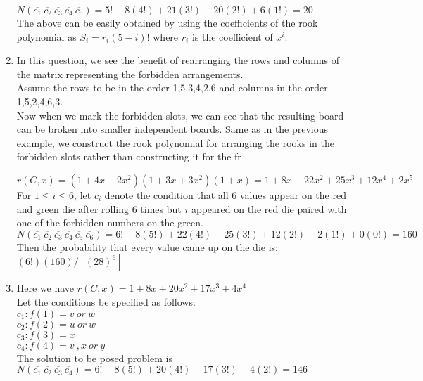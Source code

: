 \documentclass[a4paper]{article}
\begin{document}
\begin{enumerate}
$N(\overline{c_1}~\overline{c_2}~\overline{c_3}~\overline{c_4}~\overline{c_5}) = 5!-8(4!)+ 21(3!) -20(2!) +  6(1!) = 20 $ \\

The above can be easily obtained by using the coefficients of the rook polynomial as $S_i = r_i(5-i)!$ where $r_i$ is the coefficient of $x^i$. 


\item In this question, we see the benefit of rearranging the rows and columns of the matrix representing the forbidden arrangements. \\
Assume the rows to be in the order 1,5,3,4,2,6 and columns in the order 1,5,2,4,6,3. \\
Now when we mark the forbidden slots, we can see that the resulting board can be broken into smaller independent boards. Same as in the previous example, we construct the rook polynomial for arranging the rooks in the forbidden slots rather than constructing it for the fr

$r(C,x)=(1+4x+2x^2)(1+3x+3x^2)(1+x)=1+8x+22x^2+25x^3+12x^4+2x^5$\\
For $1\leq i \leq 6$, let $c_i$ denote the condition that all 6 values appear on the red and green die after rolling 6 times but $i$ appeared on the red die paired with one of the forbidden numbers on the green. \\

$N(\overline{c_1}~\overline{c_2}~\overline{c_3}~\overline{c_4}~\overline{c_5}~\overline{c_6}) = 6!-8(5!)+ 22(4!) -25(3!) +  12(2!) - 2(1!) + 0(0!) = 160 $\\
Then the probability that every value came up on the die is: $(6!)(160)/[(28)^6]$ 


\item Here we have $r(C,x) = 1+8x+20x^2+17x^3+4x^4$\\
Let the conditions be specified as follows:\\
$c_1: f(1)= v\ or\ w$\\
$c_2: f(2)= u\ or\ w$\\
$c_3: f(3)=x$\\
$c_4: f(4)= v\ ,x\ or\ y$\\ 
The solution to be posed problem is $N(\overline{c_1}~\overline{c_2}~\overline{c_3}~\overline{c_4})= 6!-8(5!)+20(4!)-17(3!)+4(2!)=146$










\end{enumerate}
\end{document}
